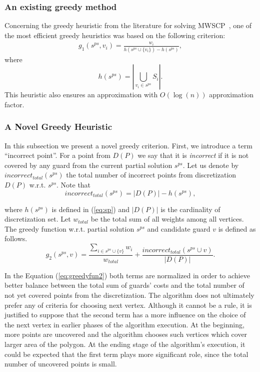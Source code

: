 \documentclass[runningheads,a4paper]{elsarticle}
\begin{document}
	\subsubsection{An existing greedy method}
	
	Concerning the greedy heuristic from the literature for solving MWSCP~\cite{chvatal1979greedy, lovasz1975ratio}, one of the most efficient greedy heuristics was based on the following criterion:
	\begin{align}\label{eq:Lovasz}
	g_1(s^{ps}, v_i) = \frac{w_{i}}{ h(s^{ps} \cup \{v_i\})  -h(s^{ps})},
	\end{align}
	where
\begin{equation}\label{eq:sp}
    h(s^{ps}) = \left|\bigcup_{v_i \in s^{ps}} S_i \right|.
    \end{equation}
	This heuristic  also ensures an approximation with $O(\log(n))$ approximation factor.
	
	\subsubsection{A Novel Greedy Heuristic}
	In this subsection we present a novel greedy criterion. First, we introduce a term  ``incorrect point''. For a point from $D(P)$ we say that it is \textit{incorrect} if it is not covered by any guard from the current partial solution $s^{ps}$. Let us denote by $incorrect_{total}(s^{ps})$ the total number of incorrect points from discretization $D(P)$ w.r.t. $s^{ps}$. Note that
 \begin{equation}\label{eq:incorrect}
 incorrect_{total}(s^{ps}) = |D(P)|-h(s^{ps}),
 \end{equation}

 where $h(s^{ps})$ is defined in (\ref{eq:sp}) and $|D(P)|$ is the cardinality of discretization set. Let $w_{total}$ be the total sum of all weights among all vertices. The greedy function w.r.t. partial solution $s^{ps}$ and candidate guard $v$ is defined as follows.
	\begin{equation}\label{eq:greedyfun2}
    g_2(s^{ps}, v)  =    \frac{\sum_{i \in s^{ps} \cup \{v\}} w_i}{w_{total}}+ \frac{incorrect_{total}(s^{ps}\cup v)}{|D(P)|}.
	\end{equation}

	In the Equation  (\ref{eq:greedyfun2}) both terms are normalized in order to achieve better balance between the total sum of guards' costs and the total number of not yet covered points from the discretization. The algorithm does not  ultimately prefer any of criteria for choosing next vertex. Although it cannot be a rule, it is justified to suppose that the second term has a more influence on the choice of the next vertex in earlier phases of the algorithm execution. At the beginning, more points are uncovered and the algorithm  chooses such vertices which cover larger area of the polygon. At the ending stage of the algorithm's execution, it could be expected that the first term plays more significant role, since the total number of uncovered points is small.
	
\end{document}

